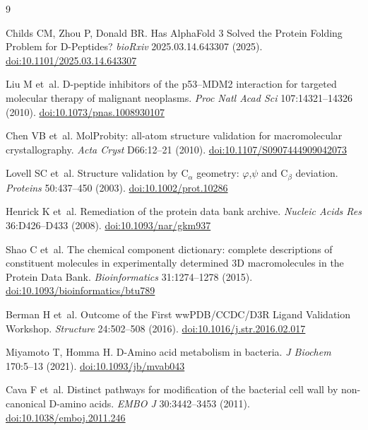 \documentclass[11pt]{article}
\begin{document}
\begin{thebibliography}{9}

Childs CM, Zhou P, Donald BR.
\newblock Has AlphaFold 3 Solved the Protein Folding Problem for D-Peptides?
\newblock \textit{bioRxiv} 2025.03.14.643307 (2025).
\newblock \href{https://doi.org/10.1101/2025.03.14.643307}{doi:10.1101/2025.03.14.643307}

Liu M et~al.
\newblock D-peptide inhibitors of the p53--MDM2 interaction for targeted
molecular therapy of malignant neoplasms.
\newblock \textit{Proc Natl Acad Sci} 107:14321--14326 (2010).
\newblock \href{https://doi.org/10.1073/pnas.1008930107}{doi:10.1073/pnas.1008930107}

Chen VB et~al.
\newblock MolProbity: all-atom structure validation for macromolecular
crystallography.
\newblock \textit{Acta Cryst} D66:12--21 (2010).
\newblock \href{https://doi.org/10.1107/S0907444909042073}{doi:10.1107/S0907444909042073}

Lovell SC et~al.
\newblock Structure validation by C$_\alpha$ geometry: $\varphi$,$\psi$ and
C$_\beta$ deviation.
\newblock \textit{Proteins} 50:437--450 (2003).
\newblock \href{https://doi.org/10.1002/prot.10286}{doi:10.1002/prot.10286}

Henrick K et~al.
\newblock Remediation of the protein data bank archive.
\newblock \textit{Nucleic Acids Res} 36:D426--D433 (2008).
\newblock \href{https://doi.org/10.1093/nar/gkm937}{doi:10.1093/nar/gkm937}

Shao C et~al.
\newblock The chemical component dictionary: complete descriptions of
constituent molecules in experimentally determined 3D macromolecules in
the Protein Data Bank.
\newblock \textit{Bioinformatics} 31:1274--1278 (2015).
\newblock \href{https://doi.org/10.1093/bioinformatics/btu789}{doi:10.1093/bioinformatics/btu789}

Berman H et~al.
\newblock Outcome of the First wwPDB/CCDC/D3R Ligand Validation Workshop.
\newblock \textit{Structure} 24:502--508 (2016).
\newblock \href{https://doi.org/10.1016/j.str.2016.02.017}{doi:10.1016/j.str.2016.02.017}

Miyamoto T, Homma H.
\newblock D-Amino acid metabolism in bacteria.
\newblock \textit{J Biochem} 170:5--13 (2021).
\newblock \href{https://doi.org/10.1093/jb/mvab043}{doi:10.1093/jb/mvab043}

Cava F et~al.
\newblock Distinct pathways for modification of the bacterial cell wall by
non-canonical D-amino acids.
\newblock \textit{EMBO J} 30:3442--3453 (2011).
\newblock \href{https://doi.org/10.1038/emboj.2011.246}{doi:10.1038/emboj.2011.246}

\end{thebibliography}
\end{document}
